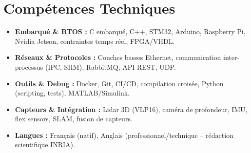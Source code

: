 \documentclass[a4paper,11pt]{article}
\begin{document}
\section{Compétences Techniques}
\begin{itemize}[leftmargin=*, nosep]
    \item \small{\textbf{Embarqué \& RTOS :} C embarqué, C++, STM32, Arduino, Raspberry Pi, Nvidia Jetson, contraintes temps réel, FPGA/VHDL.}
    \item \small{\textbf{Réseaux \& Protocoles :} Couches basses Ethernet, communication inter-processus (IPC, SHM), RabbitMQ, API REST, UDP.}
    \item \small{\textbf{Outils \& Debug :} Docker, Git, CI/CD, compilation croisée, Python (scripting, tests), MATLAB/Simulink.}
    \item \small{\textbf{Capteurs \& Intégration :} Lidar 3D (VLP16), caméra de profondeur, IMU, flex sensors, SLAM, fusion de capteurs.}
    \item \small{\textbf{Langues :} Français (natif), Anglais (professionnel/technique -- rédaction scientifique INRIA).}
\end{itemize}

\end{document}
